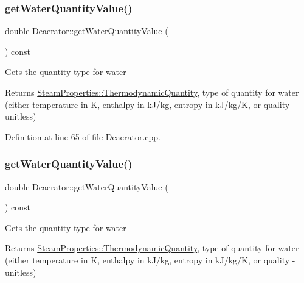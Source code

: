 \subsubsection{\texorpdfstring{get\+Water\+Quantity\+Value()}{getWaterQuantityValue()}\hspace{0.1cm}{\footnotesize\ttfamily [1/3]}}
{\footnotesize\ttfamily double Deaerator\+::get\+Water\+Quantity\+Value (\begin{DoxyParamCaption}{ }\end{DoxyParamCaption}) const}

Gets the quantity type for water \begin{DoxyReturn}{Returns}
\hyperlink{class_steam_properties_ae0294bedf7d178c2d8fb6aed0f62fbff}{Steam\+Properties\+::\+Thermodynamic\+Quantity}, type of quantity for water (either temperature in K, enthalpy in k\+J/kg, entropy in k\+J/kg/K, or quality -\/ unitless) 
\end{DoxyReturn}


Definition at line 65 of file Deaerator.\+cpp.

\mbox{\label{class_deaerator_a9362430fb04802b6f14c9bf09d62a466}} 
\subsubsection{\texorpdfstring{get\+Water\+Quantity\+Value()}{getWaterQuantityValue()}\hspace{0.1cm}{\footnotesize\ttfamily [2/3]}}
{\footnotesize\ttfamily double Deaerator\+::get\+Water\+Quantity\+Value (\begin{DoxyParamCaption}{ }\end{DoxyParamCaption}) const}

Gets the quantity type for water \begin{DoxyReturn}{Returns}
\hyperlink{class_steam_properties_ae0294bedf7d178c2d8fb6aed0f62fbff}{Steam\+Properties\+::\+Thermodynamic\+Quantity}, type of quantity for water (either temperature in K, enthalpy in k\+J/kg, entropy in k\+J/kg/K, or quality -\/ unitless) 
\end{DoxyReturn}
\mbox{\label{class_deaerator_a9362430fb04802b6f14c9bf09d62a466}} 
